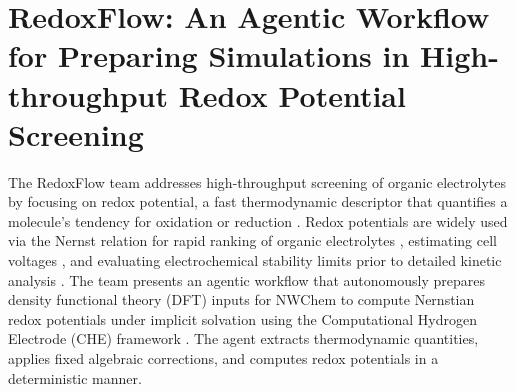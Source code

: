 





\section{RedoxFlow: An Agentic Workflow for Preparing Simulations in High-throughput Redox Potential Screening}



The RedoxFlow team addresses high-throughput screening of organic electrolytes by focusing on redox potential, a fast thermodynamic descriptor that quantifies a molecule’s tendency for oxidation or reduction \cite{min4020345}. Redox potentials are widely used via the Nernst relation for rapid ranking of organic electrolytes \cite{pelzer2017effects}, estimating cell voltages \cite{lin2016redox}, and evaluating electrochemical stability limits prior to detailed kinetic analysis \cite{wedege2016organic,hasan2023quinones}. The team presents an agentic workflow that autonomously prepares density functional theory (DFT) inputs for NWChem \cite{valiev2010nwchem} to compute Nernstian redox potentials under implicit solvation using the Computational Hydrogen Electrode (CHE) framework \cite{masood2023comparative,singh2025sulfonated}. The agent extracts thermodynamic quantities, applies fixed algebraic corrections, and computes redox potentials in a deterministic manner.

